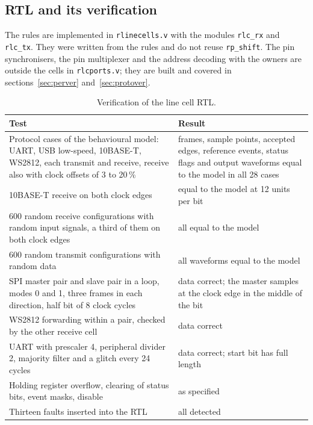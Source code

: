 \documentclass[10pt,a4paper]{article}
\begin{document}
\subsection{RTL and its verification}\label{sec:lcver}

The rules are implemented in \texttt{rlinecells.v} with the modules \texttt{rlc\_rx} and \texttt{rlc\_tx}. They
were written from the rules and do not reuse \texttt{rp\_shift}. The pin synchronisers, the pin multiplexer and
the address decoding with the owners are outside the cells in \texttt{rlcports.v}; they are built and covered in
sections~\ref{sec:perver} and~\ref{sec:protover}.

\begin{table}[H]
\centering\small
\begin{tabularx}{\linewidth}{@{}LL@{}}
\toprule
Test & Result \\
\midrule
Protocol cases of the behavioural model: UART, USB low-speed, 10BASE-T, WS2812, each transmit and receive, receive also with clock offsets of 3 to 20\,\% & frames, sample points, accepted edges, reference events, status flags and output waveforms equal to the model in all 28 cases \\
10BASE-T receive on both clock edges & equal to the model at 12 units per bit \\
600 random receive configurations with random input signals, a third of them on both clock edges & all equal to the model \\
600 random transmit configurations with random data & all waveforms equal to the model \\
SPI master pair and slave pair in a loop, modes 0 and 1, three frames in each direction, half bit of 8 clock cycles & data correct; the master samples at the clock edge in the middle of the bit \\
WS2812 forwarding within a pair, checked by the other receive cell & data correct \\
UART with prescaler 4, peripheral divider 2, majority filter and a glitch every 24 cycles & data correct; start bit has full length \\
Holding register overflow, clearing of status bits, event masks, disable & as specified \\
Thirteen faults inserted into the RTL & all detected \\
\bottomrule
\end{tabularx}
\caption{Verification of the line cell RTL.}
\end{table}
\end{document}
